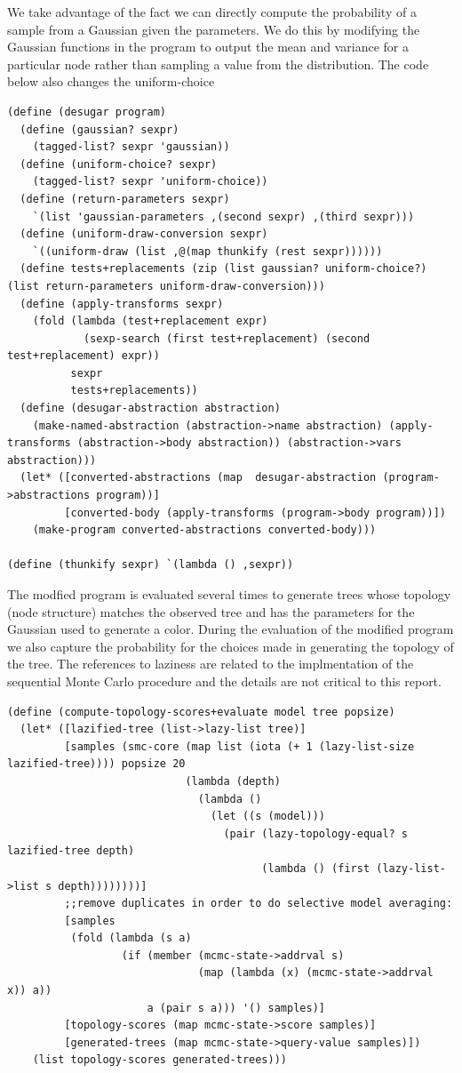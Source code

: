 \documentclass[a4paper,10pt]{article}
\begin{document}
We take advantage of the fact we can directly compute the probability of a sample from a Gaussian given the parameters.  We do this by modifying the Gaussian functions in the program to output the mean and variance for a particular node rather than sampling a value from the distribution.  The code below also changes the uniform-choice 
\begin{lstlisting}[frame=trBL]
(define (desugar program)
  (define (gaussian? sexpr)
    (tagged-list? sexpr 'gaussian))
  (define (uniform-choice? sexpr)
    (tagged-list? sexpr 'uniform-choice))
  (define (return-parameters sexpr)
    `(list 'gaussian-parameters ,(second sexpr) ,(third sexpr)))
  (define (uniform-draw-conversion sexpr)
    `((uniform-draw (list ,@(map thunkify (rest sexpr))))))
  (define tests+replacements (zip (list gaussian? uniform-choice?) (list return-parameters uniform-draw-conversion)))
  (define (apply-transforms sexpr)
    (fold (lambda (test+replacement expr)
            (sexp-search (first test+replacement) (second test+replacement) expr))
          sexpr
          tests+replacements))
  (define (desugar-abstraction abstraction)
    (make-named-abstraction (abstraction->name abstraction) (apply-transforms (abstraction->body abstraction)) (abstraction->vars abstraction)))
  (let* ([converted-abstractions (map  desugar-abstraction (program->abstractions program))]
         [converted-body (apply-transforms (program->body program))])
    (make-program converted-abstractions converted-body)))

(define (thunkify sexpr) `(lambda () ,sexpr))
\end{lstlisting}
The modfied program is evaluated several times to generate trees whose topology (node structure) matches the observed tree and has the parameters for the Gaussian used to generate a color.  During the evaluation of the modified program we also capture the probability for the choices made in generating the topology of the tree.  The references to laziness are related to the implmentation of the sequential Monte Carlo procedure and the details are not critical to this report.
\begin{lstlisting}[frame=trBL]
(define (compute-topology-scores+evaluate model tree popsize)
  (let* ([lazified-tree (list->lazy-list tree)]
         [samples (smc-core (map list (iota (+ 1 (lazy-list-size  lazified-tree)))) popsize 20
                            (lambda (depth)
                              (lambda ()
                                (let ((s (model)))
                                  (pair (lazy-topology-equal? s lazified-tree depth)
                                        (lambda () (first (lazy-list->list s depth))))))))]
         ;;remove duplicates in order to do selective model averaging:
         [samples
          (fold (lambda (s a)
                  (if (member (mcmc-state->addrval s)
                              (map (lambda (x) (mcmc-state->addrval x)) a))
                      a (pair s a))) '() samples)]
         [topology-scores (map mcmc-state->score samples)]
         [generated-trees (map mcmc-state->query-value samples)])
    (list topology-scores generated-trees)))
\end{lstlisting}
\end{document}

